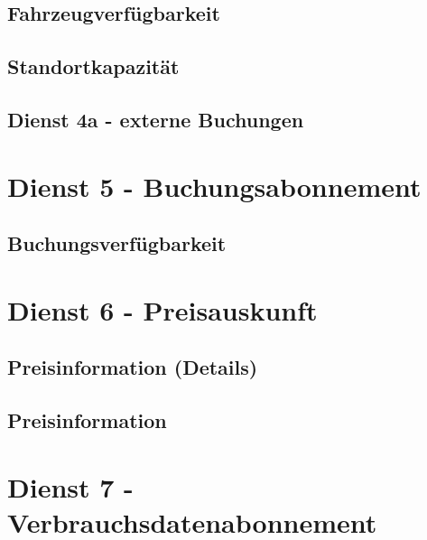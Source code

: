 \subsection*{Fahrzeugverfügbarkeit}



\subsection*{Standortkapazität}



\subsection*{Dienst 4a - externe Buchungen}
\label{sec:Datenmodell:Dienst4a}



\section{Dienst 5 - Buchungsabonnement}
\label{sec:Datenmodell:Dienst5}

\subsection*{Buchungsverfügbarkeit}



\section{Dienst 6 - Preisauskunft}
\label{sec:Datenmodell:Dienst6}

\subsection*{Preisinformation (Details)}



\subsection*{Preisinformation}




\section{Dienst 7 - Verbrauchsdatenabonnement}
\label{sec:Datenmodell:Dienst7}

